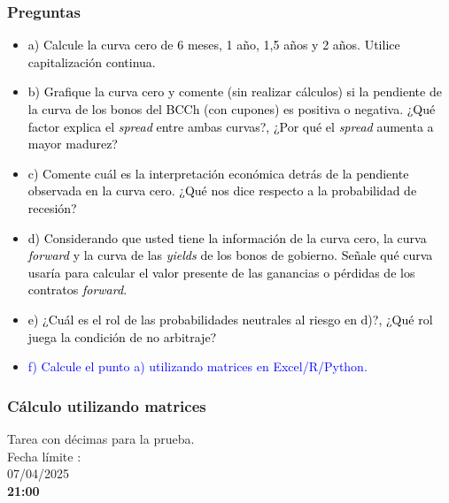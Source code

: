 \documentclass{beamer}
\begin{document}
\begin{frame}
  \frametitle{Preguntas}
  \begin{itemize}
    \scriptsize
    \item {\textcolor{black}{a) Calcule la curva cero de 6 meses, 1 año, 1,5 años y 2 años. Utilice capitalización continua.}}
    \vspace{3pt}
    \item {\textcolor{black}{b) Grafique la curva cero y comente (sin realizar cálculos) si la pendiente de la curva de los bonos del BCCh (con cupones) es positiva o negativa. ¿Qué factor explica el \textit{spread} entre ambas curvas?, ¿Por qué el \textit{spread} aumenta a mayor madurez?}}
    \vspace{3pt}
    \item {\textcolor{black}{c) Comente cuál es la interpretación económica detrás de la pendiente observada en la curva cero. ¿Qué nos dice respecto a la probabilidad de recesión?}}
    \vspace{3pt}
    \item {\textcolor{black}{d) Considerando que usted tiene la información de la curva cero, la curva \textit{forward} y la curva de las \textit{yields} de los bonos de gobierno. Señale qué curva usaría para calcular el valor presente de las ganancias o pérdidas de los contratos \textit{forward}.}}
    \vspace{3pt}
    \item {\textcolor{black}{e) ¿Cuál es el rol de las probabilidades neutrales al riesgo en d)?, ¿Qué rol juega la condición de no arbitraje?}}
    \vspace{3pt}
    \item {\Large\textcolor{blue}{f) Calcule el punto a) utilizando matrices en Excel/R/Python.}}
    \vspace{3pt}
  \end{itemize}
\end{frame}
\begin{frame}
  \frametitle{Cálculo utilizando matrices}
  \Huge
  \centering
  Tarea con décimas para la prueba.\\


  Fecha límite : \\
  07/04/2025 \\
  \textbf{ 21:00}

\end{frame}
\end{document}
